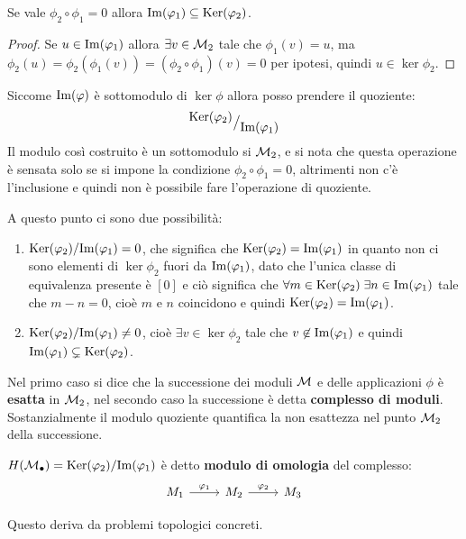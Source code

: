\begin{proposition}
  Se vale $ \phi_2 \circ \phi_1 = 0 $ allora $ \mathrm{Im}( \varphi_1 ) \subseteq \mathrm{Ker}( \varphi_2) $.
\end{proposition}
\begin{proof}
  Se $ u \in \mathrm{Im}( \varphi_1 ) $ allora $ \exists v \in \mathcal{M}_2 $ tale che $ \phi_1(v) = u $,
  ma $ \phi_2(u) = \phi_2(\phi_1(v)) = (\phi_2 \circ \phi_1)(v) = 0 $ per ipotesi, quindi $ u \in \ker{\phi_2} $.
\end{proof}
\eproof
Siccome $ \mathrm{Im}( \varphi ) $ è sottomodulo di $ \ker{\phi} $ allora posso prendere
il quoziente:
\[
  {^{\textstyle \mathrm{Ker}( \varphi_2)}\big/_{\textstyle \mathrm{Im}( \varphi_1 )}}
\]
Il modulo così costruito è un sottomodulo si $ \mathcal{M}_2 $, e si nota che questa
operazione è sensata solo se si impone la condizione $ \phi_2 \circ \phi_1 = 0 $,
altrimenti non c'è l'inclusione e quindi non è possibile fare l'operazione di
quoziente.

A questo punto ci sono due possibilità:
\begin{enumerate}
\item $ {\mathrm{Ker}( \varphi_2)} \slash {\mathrm{Im}( \varphi_1 )} = 0 $, che significa che
  $ \mathrm{Ker}( \varphi_2) = \mathrm{Im}( \varphi_1 ) $ in quanto non ci sono elementi di
  $ \ker {\phi_2} $ fuori da $ \mathrm{Im}( \varphi_1 ) $, dato che l'unica classe di equivalenza
  presente è $ [0] $ e ciò significa che
  $ \forall m \in \mathrm{Ker}( \varphi_2) \; \exists n \in \mathrm{Im}( \varphi_1 ) $ tale che
  $ m - n = 0 $, cioè $ m $ e $ n $ coincidono e quindi
  $ \mathrm{Ker}( \varphi_2) = \mathrm{Im}( \varphi_1 ) $.
\item $ {\mathrm{Ker}( \varphi_2)} \slash {\mathrm{Im}( \varphi_1 )} \not= 0 $, cioè $ \exists v \in \ker {\phi_2} $
  tale che $ v \not \in \mathrm{Im}( \varphi_1 ) $ e quindi $ \mathrm{Im}( \varphi_1 ) \subsetneq \mathrm{Ker}( \varphi_2)$.
\end{enumerate}
Nel primo caso si dice che la successione dei moduli $ \mathcal{M} $ e delle
applicazioni $ \phi $ è \textbf{esatta} in $ \mathcal{M}_2$, nel secondo caso la
successione è detta \textbf{complesso di moduli}.
Sostanzialmente il modulo quoziente quantifica la non esattezza nel punto $ \mathcal{M}_2 $
della successione.

\begin{definition}
  $ H(\mathcal{M}_\bullet) = {\mathrm{Ker}( \varphi_2)} \slash {\mathrm{Im}( \varphi_1 )} $ è detto \textbf{modulo di omologia} 
  del complesso:
  \[
    \begin{tikzcd}
      M_1 \rar{\phi_1} & M_2 \rar{\phi_2} & M_3
    \end{tikzcd}
  \]
\end{definition}
Questo deriva da problemi topologici concreti.

